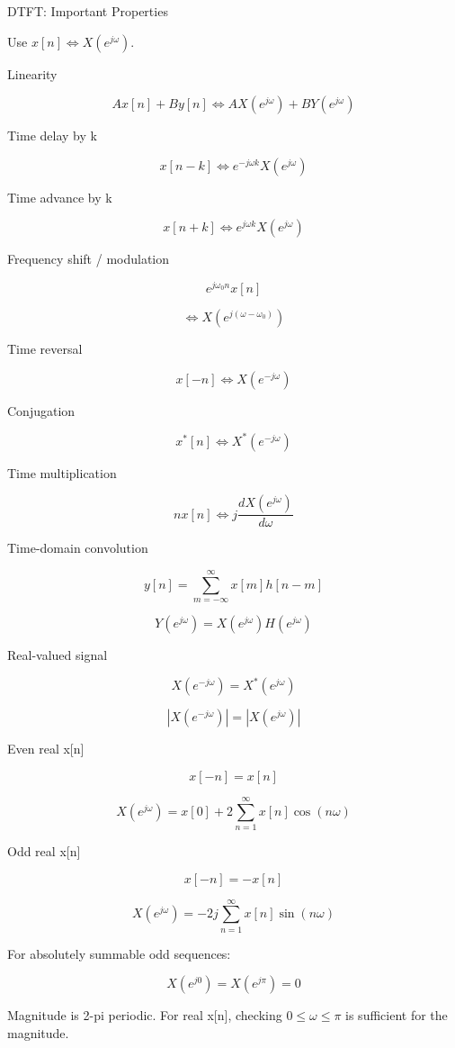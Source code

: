 DTFT: Important Properties

Use $x[n]\Leftrightarrow X(e^{j\omega})$.

Linearity

$$Ax[n]+By[n]\Leftrightarrow AX(e^{j\omega})+BY(e^{j\omega})$$

Time delay by k

$$x[n-k]\Leftrightarrow e^{-j\omega k}X(e^{j\omega})$$

Time advance by k

$$x[n+k]\Leftrightarrow e^{j\omega k}X(e^{j\omega})$$

Frequency shift / modulation

$$e^{j\omega_0n}x[n]$$

$$\Leftrightarrow X(e^{j(\omega-\omega_0)})$$

Time reversal

$$x[-n]\Leftrightarrow X(e^{-j\omega})$$

Conjugation

$$x^*[n]\Leftrightarrow X^*(e^{-j\omega})$$

Time multiplication

$$nx[n]\Leftrightarrow j\frac{dX(e^{j\omega})}{d\omega}$$

Time-domain convolution

$$y[n]=\sum_{m=-\infty}^{\infty}x[m]h[n-m]$$

$$Y(e^{j\omega})=X(e^{j\omega})H(e^{j\omega})$$

Real-valued signal

$$X(e^{-j\omega})=X^*(e^{j\omega})$$

$$|X(e^{-j\omega})|=|X(e^{j\omega})|$$

Even real x[n]

$$x[-n]=x[n]$$

$$X(e^{j\omega})=x[0]+2\sum_{n=1}^{\infty}x[n]\cos(n\omega)$$

Odd real x[n]

$$x[-n]=-x[n]$$

$$X(e^{j\omega})=-2j\sum_{n=1}^{\infty}x[n]\sin(n\omega)$$

For absolutely summable odd sequences:

$$X(e^{j0})=X(e^{j\pi})=0$$

Magnitude is 2-pi periodic. For real x[n], checking $0\le\omega\le\pi$ is sufficient for the magnitude.
